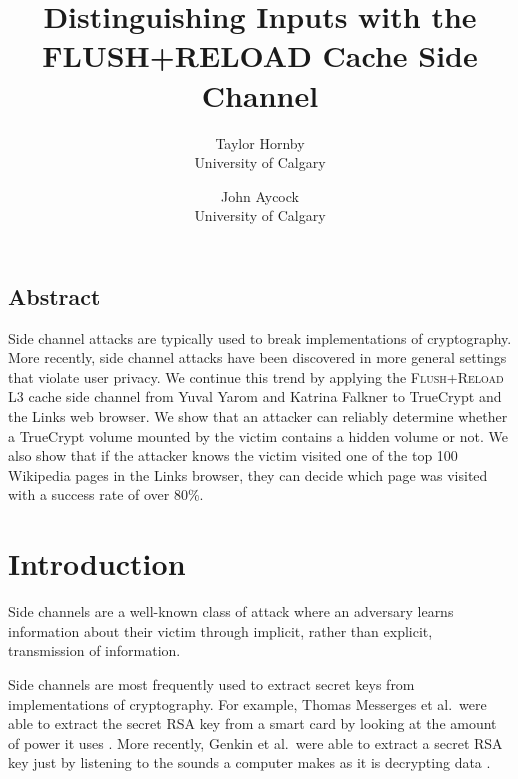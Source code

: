 \documentclass[letterpaper,twocolumn,10pt]{article}
\begin{document}
\date{}

\title{\Large \bf Distinguishing Inputs with the FLUSH+RELOAD Cache Side Channel}

\author{
{\rm Taylor Hornby}\\
University of Calgary
\and
{\rm John Aycock}\\
University of Calgary
} %

\maketitle

\thispagestyle{empty}


\subsection*{Abstract}
Side channel attacks are typically used to break implementations of
cryptography. More recently, side channel attacks have been discovered in
more general settings that violate user privacy. We continue this trend by
applying the \textsc{Flush+Reload} L3 cache side channel from Yuval Yarom and Katrina
Falkner \cite{yarom2013flush} to TrueCrypt and the Links web browser. We
show that an attacker can reliably determine whether a TrueCrypt volume
mounted by the victim contains a hidden volume or not. We also show that if
the attacker knows the victim visited one of the top 100 Wikipedia pages in
the Links browser, they can decide which page was visited with a success
rate of over 80\%.

\section{Introduction}
\label{sec:intro}

Side channels are a well-known class of attack where an adversary learns
information about their victim through implicit, rather than explicit,
transmission of information.

Side channels are most frequently used to extract secret keys from
implementations of cryptography. For example, Thomas Messerges et al.\ were able
to extract the secret RSA key from a smart card by looking at the amount of
power it uses \cite{messerges1999power}. More recently, Genkin et al.\ were able
to extract a secret RSA key just by listening to the sounds a computer makes as
it is decrypting data \cite{genkin2013rsa}. 
\end{document}

